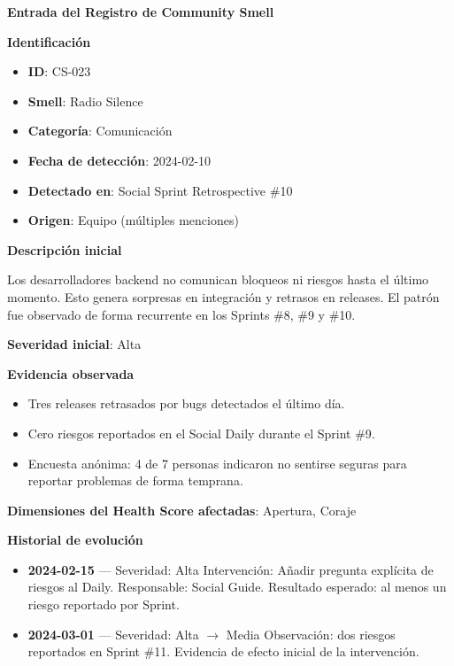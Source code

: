 \begin{protocolo}
    \textbf{Entrada del Registro de Community Smell}

    \textbf{Identificación}
    \begin{itemize}
        \item \textbf{ID}: CS-023
        \item \textbf{Smell}: Radio Silence
        \item \textbf{Categoría}: Comunicación
        \item \textbf{Fecha de detección}: 2024-02-10
        \item \textbf{Detectado en}: Social Sprint Retrospective \#10
        \item \textbf{Origen}: Equipo (múltiples menciones)
    \end{itemize}

    \textbf{Descripción inicial}

    Los desarrolladores backend no comunican bloqueos ni riesgos hasta el último momento.
    Esto genera sorpresas en integración y retrasos en releases.
    El patrón fue observado de forma recurrente en los Sprints \#8, \#9 y \#10.

    \medskip
    \textbf{Severidad inicial}: Alta

    \medskip
    \textbf{Evidencia observada}
    \begin{itemize}
        \item Tres releases retrasados por bugs detectados el último día.
        \item Cero riesgos reportados en el Social Daily durante el Sprint \#9.
        \item Encuesta anónima: 4 de 7 personas indicaron no sentirse seguras para reportar problemas de forma temprana.
    \end{itemize}

    \textbf{Dimensiones del Health Score afectadas}: Apertura, Coraje

    \medskip
    \textbf{Historial de evolución}

    \begin{itemize}
        \item \textbf{2024-02-15} — Severidad: Alta
              Intervención: Añadir pregunta explícita de riesgos al Daily.
              Responsable: Social Guide.
              Resultado esperado: al menos un riesgo reportado por Sprint.

        \item \textbf{2024-03-01} — Severidad: Alta $\rightarrow$ Media
              Observación: dos riesgos reportados en Sprint \#11.
              Evidencia de efecto inicial de la intervención.


\end{itemize}
\end{protocolo}
